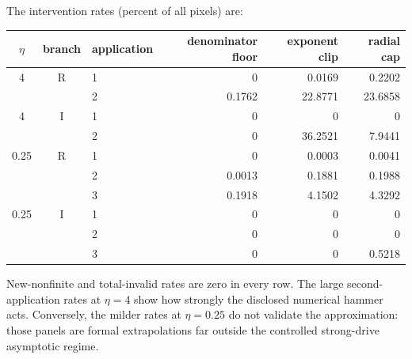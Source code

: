 \documentclass[11pt]{article}
\theoremstyle{remark}
\begin{document}
The intervention rates (percent of all pixels) are:
\begin{center}
\small
\begin{tabular}{cclrrr}
\hline
\(\eta\)&branch&application&denominator floor&exponent clip&radial cap\\ \hline
4&R&1&0&0.0169&0.2202\\
 &&2&0.1762&22.8771&23.6858\\
4&I&1&0&0&0\\
 &&2&0&36.2521&7.9441\\
0.25&R&1&0&0.0003&0.0041\\
 &&2&0.0013&0.1881&0.1988\\
 &&3&0.1918&4.1502&4.3292\\
0.25&I&1&0&0&0\\
 &&2&0&0&0\\
 &&3&0&0&0.5218\\ \hline
\end{tabular}
\end{center}
New-nonfinite and total-invalid rates are zero in every row.  The large
second-application rates at \(\eta=4\) show how strongly the disclosed
numerical hammer acts.  Conversely, the milder rates at \(\eta=0.25\) do not
validate the approximation: those panels are formal extrapolations far
outside the controlled strong-drive asymptotic regime.
\end{document}
